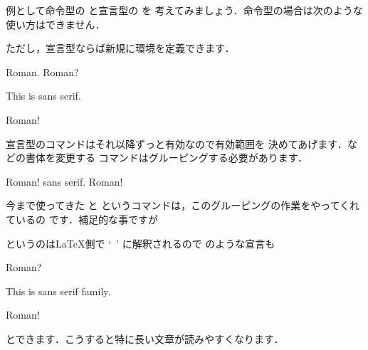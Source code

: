 例として命令型の  と宣言型の  を
考えてみましょう．命令型の場合は次のような使い方はできません．


ただし，宣言型ならば新規に環境を定義できます．

\begin{InOut}
\newenvironment{sffont}{\sffamily}{}
Roman.
\begin{sffont} 
   Roman? \par This is sans serif.
\end{sffont}
\par Roman!
\end{InOut}

宣言型のコマンドはそれ以降ずっと有効なので有効範囲を
決めてあげます．などの書体を変更する
コマンドはグルーピングする必要があります．
\begin{InOut}
Roman! {\sffamily sans serif.}
Roman!
\end{InOut}

\begin{Trick}
今まで使ってきた  と  
というコマンドは，このグルーピングの作業をやってくれているの
です．補足的な事ですが
\begin{Syntax}
  
\end{Syntax}
というのは{\LaTeX}側で
`\texttt{\lb {}   \rb}'
に解釈されるので  のような宣言も
\begin{InOut}
Roman?
\begin{sffamily} 
This is sans serif family.\par
\end{sffamily} 
Roman!
\end{InOut}
とできます．こうすると特に長い文章が読みやすくなります．
\end{Trick} 

